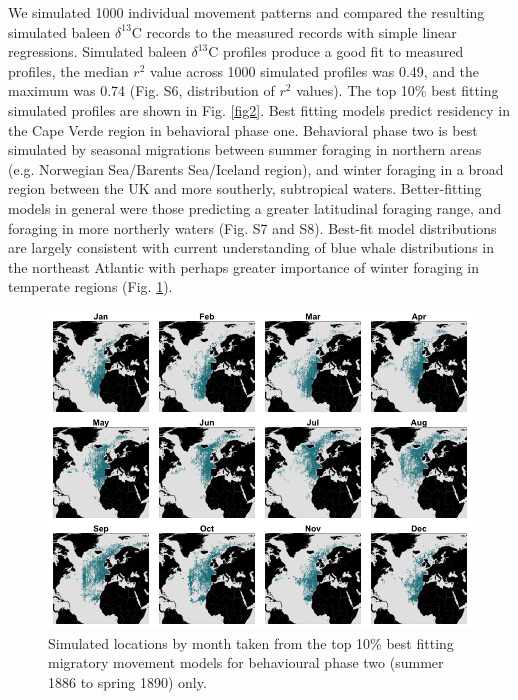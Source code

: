 \documentclass[a4paper,12pt]{article}
\begin{document}
We simulated 1000 individual movement patterns and compared the resulting simulated baleen \(\delta^{13}\)C records to the measured records with simple linear regressions. 
Simulated baleen \(\delta^{13}\)C profiles produce a good fit to measured profiles, the median \(r^{2}\) value across 1000 simulated profiles was 0.49, and the maximum was 0.74 (Fig. S6, distribution of \(r^{2}\) values). 
The top 10\% best fitting simulated profiles are shown in Fig. \ref{fig2}. 
Best fitting models predict residency in the Cape Verde region in behavioral phase one. 
Behavioral phase two is best simulated by seasonal migrations between summer foraging in northern areas (e.g. Norwegian Sea/Barents Sea/Iceland region), and winter foraging in a broad region between the UK and more southerly, subtropical waters. 
Better-fitting models in general were those predicting a greater latitudinal foraging range, and foraging in more northerly waters (Fig. S7 and S8). 
Best-fit model distributions are largely consistent with current understanding of blue whale distributions in the northeast Atlantic \cite{reeves2004historical,baines2014upwellings,baines2017autumn,reeves2004historical} with perhaps greater importance of winter foraging in temperate regions (Fig. \ref{fig4}).

\begin{figure}
 \centering
  \includegraphics[width = \linewidth]{figures/Figure-4-monthly.png}
  \caption{Simulated locations by month taken from the top 10\% best fitting migratory movement models for behavioural phase two (summer 1886 to spring 1890) only.}
  \label{fig4}
\end{figure}
\end{document}

